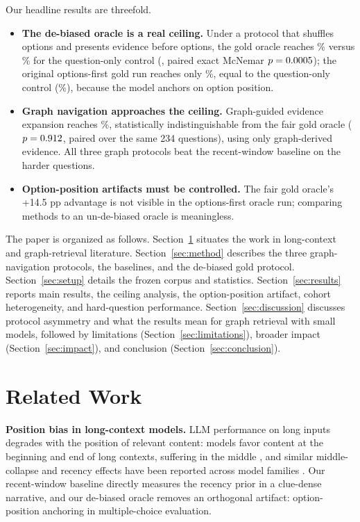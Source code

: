 \documentclass{article}
\newcommand{\pp}{\ensuremath{\,\mathrm{pp}}}
\begin{document}
Our headline results are threefold.

\begin{itemize}
\item \textbf{The de-biased oracle is a real ceiling.} Under a protocol that
shuffles options and presents evidence before options, the gold oracle reaches
\GoldCeilingAcc\% versus \QZeroAcc\% for the question-only control
(\GoldVsTerseDelta{}, paired exact McNemar $p=0.0005{}$); the original
options-first gold run reaches only \GoldOrigAcc\%, equal to the question-only
control (\QZeroAcc\%), because the model anchors on option position.
\item \textbf{Graph navigation approaches the ceiling.} Graph-guided evidence
expansion reaches \GraphExpansionAcc\%, statistically indistinguishable from
the fair gold oracle ($p=0.912{}$, paired over the same 234 questions),
using only graph-derived evidence. All three graph protocols beat the
recent-window baseline on the harder questions.
\item \textbf{Option-position artifacts must be controlled.} The fair gold
oracle's +14.5\,\pp{} advantage is not visible in the options-first oracle run;
comparing methods to an un-de-biased oracle is meaningless.
\end{itemize}

The paper is organized as follows. Section~\ref{sec:related} situates the work
in long-context and graph-retrieval literature. Section~\ref{sec:method}
describes the three graph-navigation protocols, the baselines, and the de-biased
gold protocol. Section~\ref{sec:setup} details the frozen corpus and statistics.
Section~\ref{sec:results} reports main results, the ceiling analysis, the
option-position artifact, cohort heterogeneity, and hard-question performance.
Section~\ref{sec:discussion} discusses protocol asymmetry and what the results
mean for graph retrieval with small models, followed by limitations
(Section~\ref{sec:limitations}), broader impact (Section~\ref{sec:impact}), and
conclusion (Section~\ref{sec:conclusion}).

\section{Related Work}
\label{sec:related}

\textbf{Position bias in long-context models.} LLM performance on long inputs
degrades with the position of relevant content: models favor content at the
beginning and end of long contexts, suffering in the middle
\citep{liu2024lost}, and similar middle-collapse and recency effects have been
reported across model families \citep{hsieh2024found}. Our recent-window
baseline directly measures the recency prior in a clue-dense narrative, and our
de-biased oracle removes an orthogonal artifact: option-position anchoring in
multiple-choice evaluation.
\end{document}
